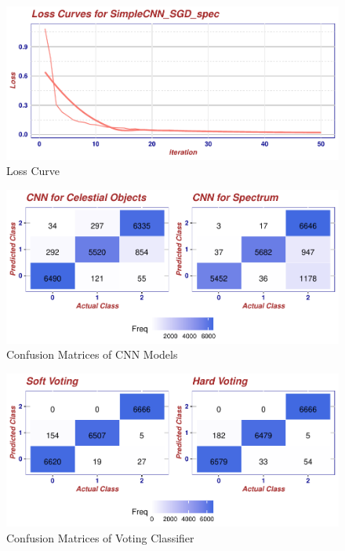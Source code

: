 \documentclass[
  11pt,
]{article}
\begin{document}
\begin{figure}
\centering
\includegraphics{final_report_files/figure-latex/loss-simp-cnn-1.pdf}
\caption{\label{fig:loss-simp-cnn}Loss Curve}
\end{figure}

\begin{figure}
\centering
\includegraphics{final_report_files/figure-latex/cm-cnn-1.pdf}
\caption{\label{fig:cm-cnn}Confusion Matrices of CNN Models}
\end{figure}

\begin{figure}
\centering
\includegraphics{final_report_files/figure-latex/cm-vc-1.pdf}
\caption{\label{fig:cm-vc}Confusion Matrices of Voting Classifier}
\end{figure}
\end{document}

